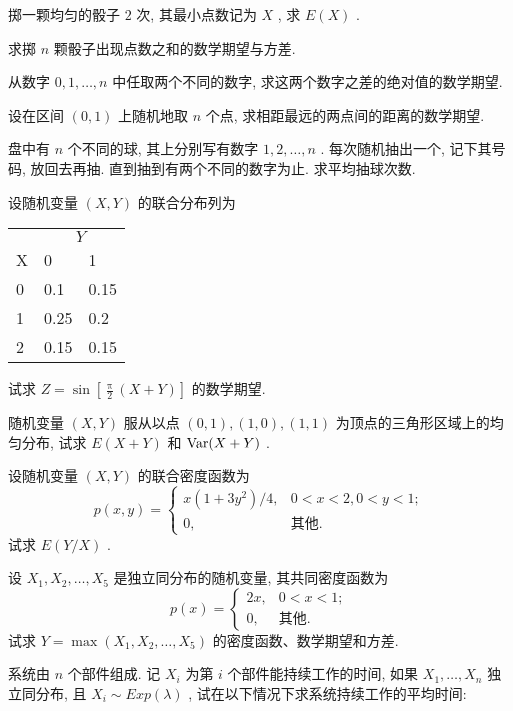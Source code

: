 	\begin{xiti}
		\item 掷一颗均匀的骰子 $2$ 次, 其最小点数记为 $X$ , 求 $E(X)$ .
		\item 求掷 $n$ 颗骰子出现点数之和的数学期望与方差.
		\item 从数字 $0,1,\ldots,n$ 中任取两个不同的数字, 求这两个数字之差的绝对值的数学期望.
		\item 设在区间 $(0,1)$ 上随机地取 $n$ 个点, 求相距最远的两点间的距离的数学期望.
		\item 盘中有 $n$ 个不同的球, 其上分别写有数字 $1,2,\ldots,n$ . 每次随机抽出一个, 记下其号码, 放回去再抽. 直到抽到有两个不同的数字为止. 求平均抽球次数.
		\item 设随机变量 $(X,Y)$ 的联合分布列为
			\begin{center}
				\begin{tabularx}{0.8\textwidth}{YYY}
					\toprule
					 & \\
					X & 0 & 1\\
					 & 0.1 & 0.15\\
					1 & 0.25 & 0.2\\
					2 & 0.15 & 0.15\\
					\bottomrule
				\end{tabularx}
			\end{center}
		试求 $Z=\sin\left[ \frac{\uppi}{2}(X+Y) \right]$ 的数学期望.
		\item 随机变量 $(X,Y)$ 服从以点 $(0,1),(1,0),(1,1)$ 为顶点的三角形区域上的均匀分布, 试求 $E(X+Y)$ 和 $\operatorname{Var}(X+Y)$ .
		\item 设随机变量 $(X,Y)$ 的联合密度函数为
			\begin{equation*}
				p(x,y)=\begin{cases}
					x(1+3y^2)/4, & 0<x<2,0<y<1;\\
					0, & \text{其他}.
				\end{cases}
			\end{equation*}
			试求 $E(Y/X)$ .
		\item 设 $X_1,X_2,\ldots,X_5$ 是独立同分布的随机变量, 其共同密度函数为
			\begin{equation*}
				p(x)=\begin{cases}
					2x, & 0<x<1;\\
					0, & \text{其他}.
				\end{cases}
			\end{equation*}
			试求 $Y=\max \left(X_{1}, X_{2}, \ldots, X_{5}\right)$ 的密度函数、数学期望和方差.
		\item 系统由 $n$ 个部件组成. 记 $X_i$ 为第 $i$ 个部件能持续工作的时间, 如果 $X_1,\ldots,X_n$ 独立同分布, 且 $X_i\sim Exp(\lambda)$ , 试在以下情况下求系统持续工作的平均时间:

\end{xiti}
